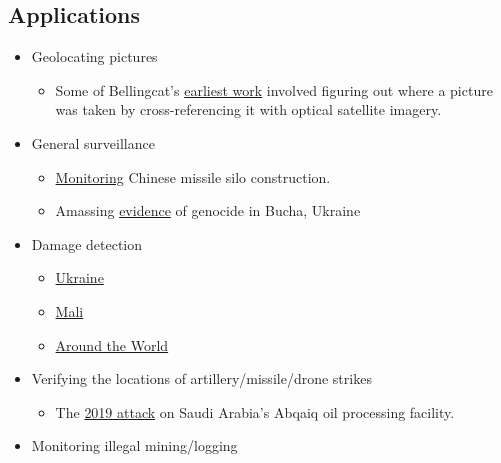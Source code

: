 \documentclass[
  letterpaper,
  DIV=11,
  numbers=noendperiod]{scrreprt}
\providecommand{\tightlist}{%
  \setlength{\itemsep}{0pt}\setlength{\parskip}{0pt}}\usepackage{longtable,booktabs,array}
\begin{document}
\hypertarget{applications}{%
\subsection*{Applications}\label{applications}}

\begin{itemize}
\tightlist
\item
  Geolocating pictures

  \begin{itemize}
  \tightlist
  \item
    Some of Bellingcat's
    \href{https://www.bellingcat.com/resources/how-tos/2014/07/09/verification-and-geolocation-tricks-and-tips-with-google-earth/}{earliest
    work} involved figuring out where a picture was taken by
    cross-referencing it with optical satellite imagery.
  \end{itemize}
\item
  General surveillance

  \begin{itemize}
  \tightlist
  \item
    \href{https://web.archive.org/web/20220415054905/https://fas.org/blogs/security/2021/11/a-closer-look-at-chinas-missile-silo-construction/}{Monitoring}
    Chinese missile silo construction.
  \item
    Amassing
    \href{https://www.nytimes.com/2022/04/04/world/europe/bucha-ukraine-bodies.html}{evidence}
    of genocide in Bucha, Ukraine
  \end{itemize}
\item
  Damage detection

  \begin{itemize}
  \tightlist
  \item
    \href{https://www.theguardian.com/world/2022/oct/27/before-and-after-satellite-imagery-will-track-ukraine-cultural-damage-un-says}{Ukraine}
  \item
    \href{https://reliefweb.int/report/mali/satellite-imagery-conflict-affected-areas-how-technology-can-support-wfp-emergency}{Mali}
  \item
    \href{https://www.pnas.org/doi/pdf/10.1073/pnas.2025400118}{Around
    the World}
  \end{itemize}
\item
  Verifying the locations of artillery/missile/drone strikes

  \begin{itemize}
  \tightlist
  \item
    The
    \href{https://www.cnbc.com/2019/09/17/satellite-photos-show-extent-of-damage-to-saudi-aramco-plants.html}{2019
    attack} on Saudi Arabia's Abqaiq oil processing facility.
  \end{itemize}
\item
  Monitoring illegal mining/logging


\end{itemize}
\end{document}
